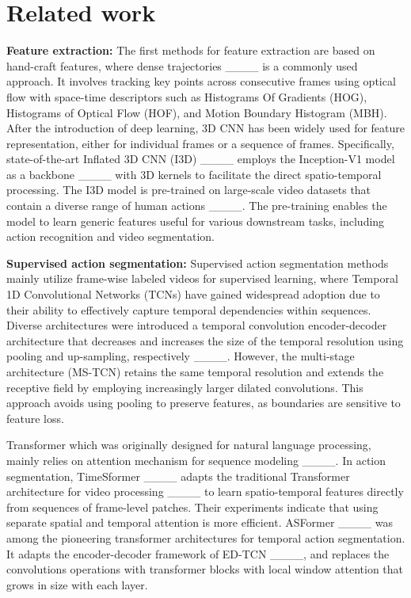 \section{Related work}
\label{section2}




\textbf{Feature extraction:} The first methods for feature extraction are based on hand-craft features, where dense trajectories ____ is a commonly used approach. It involves tracking key points across consecutive frames using optical flow with space-time descriptors such as Histograms Of Gradients (HOG), Histograms of Optical Flow (HOF), and Motion Boundary Histogram (MBH). After the introduction of deep learning, 3D CNN has been widely used for feature representation, either for individual frames or a sequence of frames. Specifically, state-of-the-art Inflated 3D CNN (I3D)  ____ employs the Inception-V1 model as a backbone ____ with 3D kernels to facilitate the direct spatio-temporal processing. The I3D model is pre-trained on large-scale video datasets that contain a diverse range of human actions ____. The pre-training enables the model to learn generic features useful for various downstream tasks, including action recognition and video segmentation.


\textbf{Supervised action segmentation:} 
Supervised action segmentation methods mainly utilize frame-wise labeled videos for supervised learning, where Temporal 1D Convolutional Networks (TCNs) have gained widespread adoption due to their ability to effectively capture temporal dependencies within sequences. Diverse architectures were introduced a temporal convolution encoder-decoder architecture that decreases and increases the size of the temporal resolution using pooling and up-sampling, respectively ____. However, the multi-stage architecture (MS-TCN) retains the same temporal resolution and extends the receptive field by employing increasingly larger dilated convolutions. This approach avoids using pooling to preserve features, as boundaries are sensitive to feature loss. 

Transformer which was originally designed for natural language processing, mainly relies on attention mechanism for sequence modeling ____. In action segmentation, TimeSformer ____ adapts the traditional Transformer architecture for video processing ____ to learn spatio-temporal features directly from sequences of frame-level patches. Their experiments indicate that using separate spatial and temporal attention is more efficient.  ASFormer ____  was among the pioneering transformer architectures for temporal action segmentation. It adapts the encoder-decoder framework of ED-TCN ____, and replaces the convolutions operations with transformer blocks with local window attention that grows in size with each layer. 

